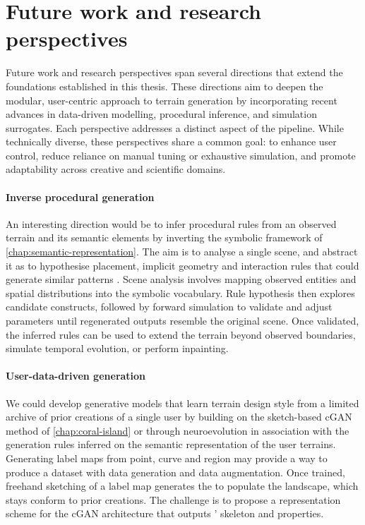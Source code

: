 \section*{Future work and research perspectives}

Future work and research perspectives span several directions that extend the foundations established in this thesis. These directions aim to deepen the modular, user-centric approach to terrain generation by incorporating recent advances in data-driven modelling, procedural inference, and simulation surrogates. Each perspective addresses a distinct aspect of the pipeline. While technically diverse, these perspectives share a common goal: to enhance user control, reduce reliance on manual tuning or exhaustive simulation, and promote adaptability across creative and scientific domains.

\paragraph{Inverse procedural generation} An interesting direction would be to infer procedural rules from an observed terrain and its semantic elements by inverting the symbolic framework of \cref{chap:semantic-representation}. The aim is to analyse a single scene, and abstract it as  to hypothesise placement, implicit geometry \cite{Guerin2016a} and interaction rules that could generate similar patterns \cite{Stava2010,Stava2014}. Scene analysis involves mapping observed entities and spatial distributions \cite{Emilien2015a} into the symbolic vocabulary. Rule hypothesis then explores candidate constructs, followed by forward simulation to validate and adjust parameters until regenerated outputs resemble the original scene. Once validated, the inferred rules can be used to extend the terrain beyond observed boundaries, simulate temporal evolution, or perform inpainting.

\paragraph{User-data-driven generation} We could develop generative models that learn terrain design style from a limited archive of prior creations of a single user by building on the sketch-based cGAN method of \cref{chap:coral-island} or through neuroevolution \cite{Stanley2005,Cortes2024} in association with the generation rules inferred on the semantic representation of the user terrains. Generating label maps from point, curve and region  may provide a way to produce a dataset with data generation and data augmentation. Once trained, freehand sketching of a label map generates the  to populate the landscape, which stays conform to prior creations. The challenge is to propose a representation scheme for the cGAN architecture that outputs ' skeleton and properties.

